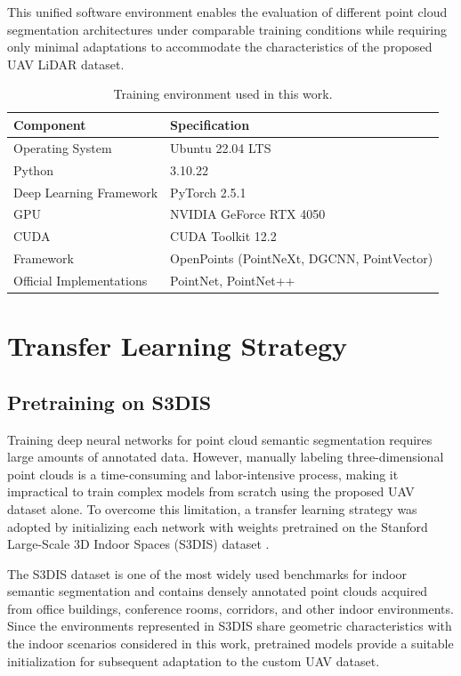 This unified software environment enables the evaluation of different point cloud segmentation architectures under comparable training conditions while requiring only minimal adaptations to accommodate the characteristics of the proposed UAV LiDAR dataset.

\begin{table}[H]
\centering
\caption{Training environment used in this work.}
\label{tab:training_environment}
\begin{tabular}{|l|l|}
\hline
\textbf{Component} & \textbf{Specification} \\
\hline
Operating System & Ubuntu 22.04 LTS \\
Python & 3.10.22 \\
Deep Learning Framework & PyTorch 2.5.1 \\
GPU & NVIDIA GeForce RTX 4050 \\
CUDA & CUDA Toolkit 12.2 \\
Framework & OpenPoints (PointNeXt, DGCNN, PointVector) \\
Official Implementations & PointNet, PointNet++ \\
\hline
\end{tabular}
\end{table}

\section{Transfer Learning Strategy}
\label{sec:transfer_learning}

\subsection{Pretraining on S3DIS}
\label{subsec:pretraining_s3dis}


Training deep neural networks for point cloud semantic segmentation requires large amounts of annotated data. However, manually labeling three-dimensional point clouds is a time-consuming and labor-intensive process, making it impractical to train complex models from scratch using the proposed UAV dataset alone. To overcome this limitation, a transfer learning strategy was adopted by initializing each network with weights pretrained on the Stanford Large-Scale 3D Indoor Spaces (S3DIS) dataset \cite{Armeni2016S3DIS}.

The S3DIS dataset is one of the most widely used benchmarks for indoor semantic segmentation and contains densely annotated point clouds acquired from office buildings, conference rooms, corridors, and other indoor environments. Since the environments represented in S3DIS share geometric characteristics with the indoor scenarios considered in this work, pretrained models provide a suitable initialization for subsequent adaptation to the custom UAV dataset.

